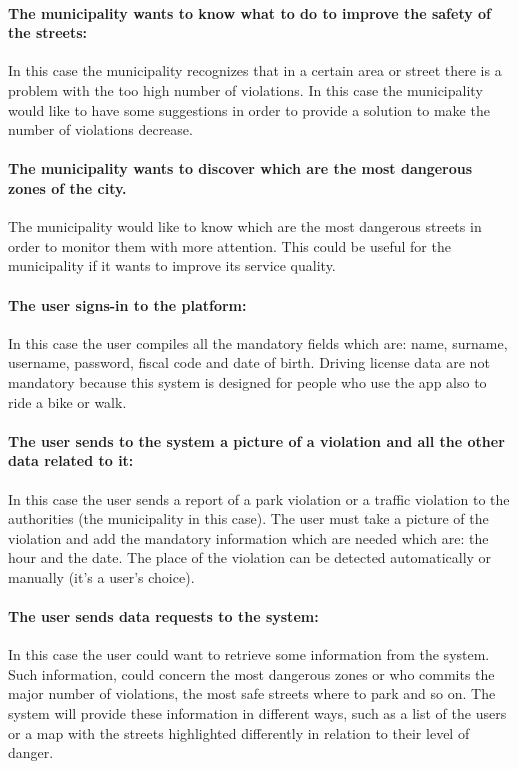 \documentclass[titlepage]{article}
\begin{document}
\paragraph{The municipality wants to know what to do to 				improve the safety of the streets: }
In this case the municipality recognizes that in a certain area or street there is a problem with the too high number of violations. In this case the municipality would like to have some suggestions in order to provide a solution to make the number of violations decrease.
\paragraph{The municipality wants to discover which are the most dangerous zones of the city.}
The municipality would like to know which are the most dangerous streets in order to monitor them with more attention. This could be useful for the municipality if it wants to improve its service quality.
\paragraph{The user signs-in to the platform: }
In this case the user compiles all the mandatory fields which are: name, surname, username, password, fiscal code and date of birth. Driving license data are not mandatory because this system is designed for people who use the app also to ride a bike or walk.
\paragraph{The user sends to the system a picture of a            	violation and all the other data related to it: }
In this case the user sends a report of a park violation or a traffic violation to the authorities (the municipality in this case). The user must take a picture of the violation and add the mandatory information which are needed which are: the hour and the date. The place of the violation can be detected automatically or manually (it's a user's choice).
\paragraph{The user sends data requests to the system: }
In this case the user could want to retrieve some information from the system. Such information, could concern the most dangerous zones or who commits the major number of violations, the most safe streets where to park and so on. The system will provide these information in different ways, such as a list of the users or a map with the streets highlighted differently in relation to their level of danger.
\end{document}
